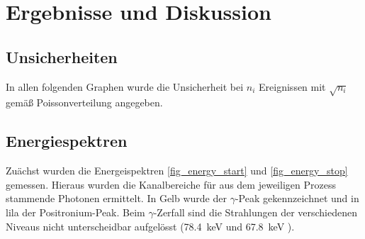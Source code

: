 \documentclass[
	a4paper,
	12pt,
	pagesize,
	ngerman
]{scrartcl}
\begin{document}
	\section{Ergebnisse und Diskussion}


	\subsection{Unsicherheiten}
	In allen folgenden Graphen wurde die Unsicherheit bei $n_i$ Ereignissen mit $\sqrt{n_i}$ gemäß Poissonverteilung angegeben.

	\subsection{Energiespektren}
	Zuächst wurden die Energeispektren \cref{fig_energy_start} und \cref{fig_energy_stop} gemessen. Hieraus wurden die Kanalbereiche für aus dem jeweiligen Prozess stammende Photonen ermittelt.
	In Gelb wurde der $\gamma$-Peak gekennzeichnet und in lila der Positronium-Peak.
	Beim $\gamma$-Zerfall sind die Strahlungen der verschiedenen Niveaus nicht unterscheidbar aufgelösst (\SI{78.4}{keV} und \SI{67.8}{keV} \cite{Anleitung}). %
\end{document}
